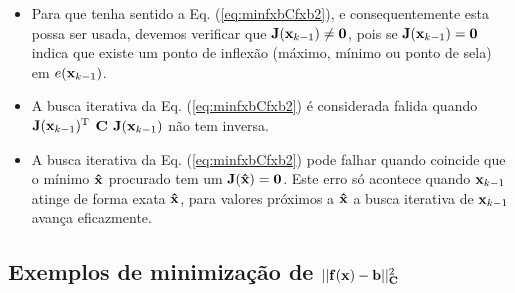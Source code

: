 \begin{theorem}
\begin{itemize}
\item Para que tenha sentido a Eq. (\ref{eq:minfxbCfxb2}),
 e consequentemente esta possa ser usada, devemos verificar que  $\MATRIX{J}(\VECTOR{x}_{k-1})\neq \MATRIX{0}$,
pois se $\MATRIX{J}(\VECTOR{x}_{k-1})= \MATRIX{0}$ indica que existe um ponto de inflexão 
(máximo, mínimo ou ponto de sela) em $e(\VECTOR{x}_{k-1})$.
\item A busca iterativa da Eq. (\ref{eq:minfxbCfxb2}) é considerada falida quando 
$\MATRIX{J}(\VECTOR{x}_{k-1})^{\transpose}$ $\MATRIX{C}$ $\MATRIX{J}(\VECTOR{x}_{k-1})$
não tem inversa.
\item A busca iterativa da Eq. (\ref{eq:minfxbCfxb2}) pode falhar quando coincide que o mínimo $\VECTOR{\hat{x}}$ procurado
tem um $\MATRIX{J}(\VECTOR{\hat{x}})=\MATRIX{0}$.
Este erro só acontece quando $\VECTOR{x}_{k-1}$ atinge de forma exata $\VECTOR{\hat{x}}$,
para valores próximos a $\VECTOR{\hat{x}}$ a busca iterativa de $\VECTOR{x}_{k-1}$ avança eficazmente.
\end{itemize}

\end{theorem}
\subsection{Exemplos de minimização de $||\VECTOR{f}(\VECTOR{x})-\VECTOR{b}||_{\MATRIX{C}}^2$}

